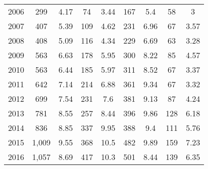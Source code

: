 \begin{table}[htbp]
\begin{tabular}{l*{8}{c}}
2006      &      299&     4.17&       74&     3.44&      167&      5.4&       58&        3\\
2007      &      407&     5.39&      109&     4.62&      231&     6.96&       67&     3.57\\
2008      &      408&     5.09&      116&     4.34&      229&     6.69&       63&     3.28\\
2009      &      563&     6.63&      178&     5.95&      300&     8.22&       85&     4.57\\
2010      &      563&     6.44&      185&     5.97&      311&     8.52&       67&     3.37\\
2011      &      642&     7.14&      214&     6.88&      361&     9.34&       67&     3.32\\
2012      &      699&     7.54&      231&      7.6&      381&     9.13&       87&     4.24\\
2013      &      781&     8.55&      257&     8.44&      396&     9.86&      128&     6.18\\
2014      &      836&     8.85&      337&     9.95&      388&      9.4&      111&     5.76\\
2015      &    1,009&     9.55&      368&     10.5&      482&     9.89&      159&     7.23\\
2016      &    1,057&     8.69&      417&     10.3&      501&     8.44&      139&     6.35\\
\hline\hline
\end{tabular}
\end{table}
